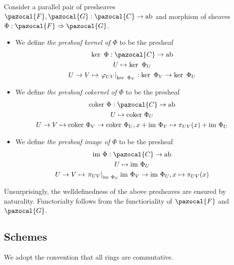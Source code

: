 \begin{definition}
     Consider a parallel pair of presheaves $\pazocal{F},\pazocal{G}: \pazocal{C}\rightarrow \mathrm{ab}$ and morphism of sheaves $\Phi: \pazocal{F}\Rightarrow \pazocal{G}$. 
    \begin{itemize}
        \item We define \emph{the presheaf kernel of $\Phi$} to be the presheaf 
    \begin{gather*}
        \ker \ \Phi: \pazocal{C} \rightarrow \mathrm{ab}\\
        U \mapsto \ker\ \Phi_U\\
        U\rightarrow V \mapsto \left.\varphi_{UV}\right|_{\ker\ \Phi_V} : \ker \ \Phi_V \rightarrow \ker \ \Phi_U
    \end{gather*}
    \item  We define \emph{the presheaf cokernel of $\Phi$} to be the presheaf 
    \begin{gather*}
        \coker\  \Phi: \pazocal{C}\rightarrow \mathrm{ab}\\
        U \mapsto \coker\ \Phi_U\\
        U\rightarrow V \mapsto \coker\ \Phi_V \rightarrow \coker\ \Phi_U, x+ \im \ \Phi_V \mapsto \pi_{UV}(x) + \im\ \Phi_U  
    \end{gather*}
    \item We define \emph{the presheaf image of $\Phi$} to be the presheaf
    \begin{gather*}
        \im \ \Phi : \pazocal{C}\rightarrow \mathrm{ab}\\
        U\mapsto \im \ \Phi_U\\
        U\rightarrow V\mapsto \left.\pi_{UV}\right|_{\im \ \Phi_V} \im \ \Phi_V\rightarrow \im \ \Phi_U, x\mapsto \pi_{UV}(x) 
    \end{gather*}
    \end{itemize}
\end{definition}
\begin{remark}
    Unsurprisingly, the welldefinedness of the above presheaves are ensured by naturality. Functorialty follows from the functioriality of $\pazocal{F}$ and $\pazocal{G}$.
\end{remark}
\subsection{Schemes}
We adopt the convention that all rings are commutative.
